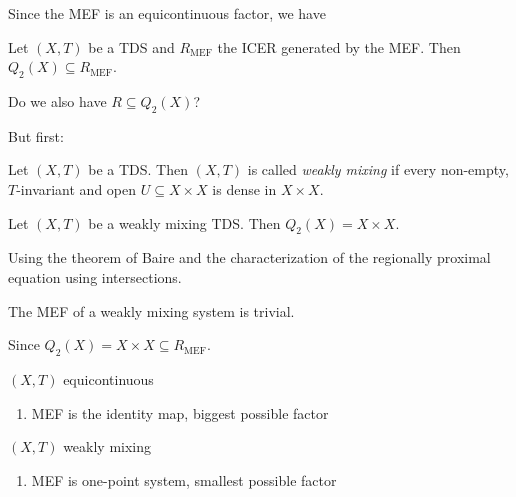 \begin{frame}
  Since the MEF is an equicontinuous factor, we have
  \begin{corollary}
    Let $(X, T)$ be a TDS and $R_\text{MEF}$ the ICER generated by the MEF.
    Then $Q_2(X) \subseteq R_\text{MEF}$.
  \end{corollary}
  Do we also have $R \subseteq Q_2(X)$?
\end{frame}

\begin{frame}
  But first:
  \begin{definition}
    Let $(X,T)$ be a TDS. Then $(X,T)$ is called \emph{weakly mixing} if every non-empty, $T$-invariant and open $U\subseteq X \times X$ is dense in $X \times X$.
  \end{definition}
  \pause
  \begin{proposition}
    Let $(X,T)$ be a weakly mixing TDS. Then $Q_2(X) = X \times X$.
  \end{proposition}
  Using the theorem of Baire and the characterization of the
  regionally proximal equation using intersections.
  \pause
  \begin{corollary}
    The MEF of a weakly mixing system is trivial.
  \end{corollary}
  Since $Q_2(X) = X \times X \subseteq R_\text{MEF}$.
\end{frame}

\begin{frame}
  \begin{minipage}{0.45\textwidth}
    \begin{center}
      $(X, T)$ equicontinuous
      \vspace{2em}
      \begin{enumerate}
        \item MEF is the identity map, biggest possible factor
      \end{enumerate}
    \end{center}
  \end{minipage}%
  \begin{minipage}{0.45\textwidth}
    \begin{center}
      $(X, T)$ weakly mixing
      \vspace{2em}
      \begin{enumerate}
        \item MEF is one-point system, smallest possible factor
      \end{enumerate}
    \end{center}
  \end{minipage}
\end{frame}

